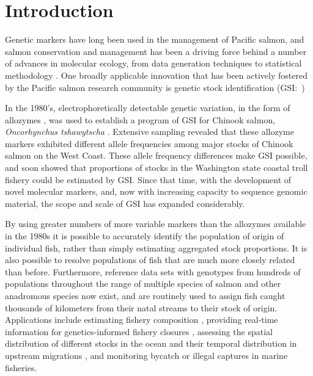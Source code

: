 
\section*{Introduction}

Genetic markers have long been used in the 
management of Pacific salmon, and salmon conservation and management has been
a driving force behind a number of advances in molecular ecology,
from data generation techniques \citep{clemento2011discovery,campbell2015genotyping,mckinney2017managing}
to statistical methodology
\citep{smouse1990genetic,anderson2002model,pella2006gibbs}.
One broadly applicable innovation that has been
actively fostered by the Pacific salmon research community is genetic
stock identification
(GSI:~\citealt{milner1982genetic,beacham2004dna,seeb2007development})


 In the 1980's, electrophoretically
detectable genetic variation, in the form of allozymes
\citep{ayala1972allozymes,allendorf1981use}, was used to
establish a program of GSI for Chinook salmon,
{\em Oncorhynchus tshawytscha} \citep{milner1982genetic}.  Extensive sampling
revealed that these allozyme markers
exhibited different allele frequencies among major stocks of Chinook salmon on the West Coast.
These allele frequency differences make GSI possible, and
\citet{milner1985genetic} soon showed that proportions of stocks in
the Washington state coastal troll fishery could be estimated by GSI.
Since that time, with the development of novel molecular markers, and, now
with increasing capacity to sequence genomic material, the scope and scale of GSI
has expanded considerably.

By using greater numbers of more variable markers than the allozymes available
in the 1980s it is possible to accurately
identify the population of origin of individual fish, rather than simply estimating
aggregated stock proportions.  It is also possible to resolve populations of fish that
are much more closely related than before.  Furthermore, reference data sets with genotypes
from hundreds of populations throughout the range of multiple species of salmon and
other anadromous species
\citep{seeb2007development,gilbey2018microsatellite,barclay2019genetic} now exist, and are routinely used to assign fish caught thousands of
kilometers from their natal streams to their stock of origin. Applications include estimating fishery
composition \citep{satterthwaite2015stock}, providing real-time information for genetics-informed fishery closures \citep{beacham2004dna}, assessing the spatial distribution of different stocks in the
ocean \citep{urawa2009stock} and their temporal distribution in upstream migrations
\citep{hess2014monitoring},  and monitoring  bycatch \citep{hasselman2016genetic} or illegal captures \citep{wilmot1999origins} in marine fisheries.

